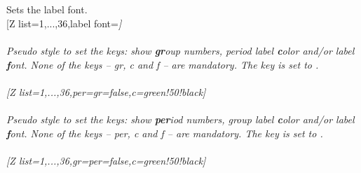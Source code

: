 \\ [10pt]\makebox[\linewidth][c]{\scalebox{.6}{\pgfPT[Z list={1,...,36},group numbers=CAS*,Roman label color=purple,group label color=teal]}}%
\\ [0pt]\pgfPTendoption%
\vfill%
\label{option_label font}%
%
{Sets the label font.}%
\\ [5pt][Z list={1,...,36},label font=\string\itshape]%
\\ [10pt]\makebox[\linewidth][c]{\scalebox{.6}{\pgfPT[Z list={1,...,36},label font=\itshape]}}%
\\ [0pt]\pgfPTendoption%
\vfill%
\label{style_per}%
%
{\textit{Pseudo style} to set the keys: show \textbf{gr}oup numbers, period label \textbf{c}olor and/or label \textbf{f}ont. None of the \textit{keys} -- gr, c and f -- are mandatory.
The key  is set to .
\\ [3pt]%
}%
\\ [5pt][Z list={1,...,36},per={gr=false,c=green!50!black}]%
\\ [10pt]\makebox[\linewidth][c]{\scalebox{.6}{\pgfPT[Z list={1,...,36},per={gr=false,c=green!50!black}]}}%
\\ [0pt]\pgfPTendstyle%
\vfill%
\label{style_gr}%
%
{\textit{Pseudo style} to set the keys: show \textbf{per}iod numbers, group label \textbf{c}olor and/or label \textbf{f}ont. None of the \textit{keys} -- per, c and f -- are mandatory.
The key  is set to .
\\ [3pt]%
}%
\\ [5pt][Z list={1,...,36},gr={per=false,c=green!50!black}]%
\\ [10pt]\makebox[\linewidth][c]{\scalebox{.6}{\pgfPT[Z list={1,...,36},gr={per=false,c=green!50!black}]}}%
